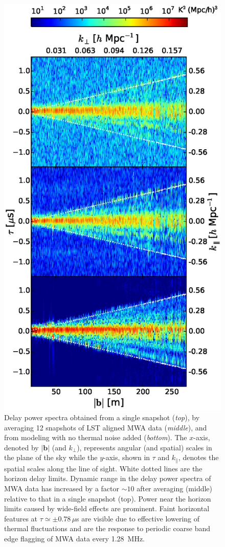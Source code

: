 \documentclass[preprint2,apjl,numberedappendix,twocolappendix,appendixfloats]{emulateapj}
\begin{document}
\begin{figure}[htb]
\centering
\includegraphics[width=\linewidth]{multi_baseline_fhd_sim_visibilities_amplitudes_comparison_185.0_MHz_30.7_MHz.eps}
\caption{Delay power spectra obtained from a single snapshot ({\it top}), by averaging 12 snapshots of LST aligned MWA data ({\it middle}), and from modeling with no thermal noise added ({\it bottom}). The $x$-axis, denoted by $|\boldsymbol{b}|$ (and $k_\perp$), represents angular (and spatial) scales in the plane of the sky while the $y$-axis, shown in $\tau$ and $k_\parallel$, denotes the spatial scales along the line of sight. White dotted lines are the horizon delay limits. Dynamic range in the delay power spectra of MWA data has increased by a factor $\sim 10$ after averaging (middle) relative to that in a single snapshot (top). Power near the horizon limits caused by wide-field effects are prominent. Faint horizontal features at $\tau\simeq\pm 0.78\,\mu$s are visible due to effective lowering of thermal fluctuations and are the response to periodic coarse band edge flagging of MWA data every 1.28~MHz. \label{fig:delay-spectra}}

\end{figure}
\end{document}
